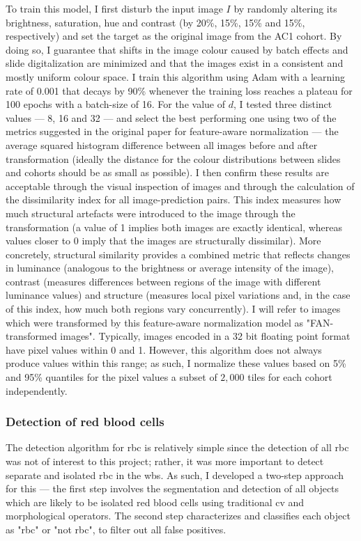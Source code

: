 To train this model, I first disturb the input image $I$ by randomly altering its brightness, saturation, hue and contrast (by 20\%, 15\%, 15\% and 15\%, respectively) and set the target as the original image from the AC1 cohort. By doing so, I guarantee that shifts in the image colour caused by batch effects and slide digitalization are minimized and that the images exist in a consistent and mostly uniform colour space. I train this algorithm using Adam with a learning rate of 0.001 that decays by 90\% whenever the training loss reaches a plateau for 100 epochs with a batch-size of 16. For the value of $d$, I tested three distinct values --- 8, 16 and 32 --- and select the best performing one using two of the metrics suggested in the original paper for feature-aware normalization \cite{Bug2017-kk} --- the average squared histogram difference between all images before and after transformation (ideally the distance for the colour distributions between slides and cohorts should be as small as possible). I then confirm these results are acceptable through the visual inspection of images and through the calculation of the dissimilarity index \cite{Wang2004-sl} for all image-prediction pairs. This index measures how much structural artefacts were introduced to the image through the transformation (a value of 1 implies both images are exactly identical, whereas values closer to 0 imply that the images are structurally dissimilar). More concretely, structural similarity provides a combined metric that reflects changes in luminance (analogous to the brightness or average intensity of the image), contrast (measures differences between regions of the image with different luminance values) and structure (measures local pixel variations and, in the case of this index, how much both regions vary concurrently). I will refer to images which were transformed by this feature-aware normalization model as "FAN-transformed images". Typically, images encoded in a 32 bit floating point format have pixel values within 0 and 1. However, this algorithm does not always produce values within this range; as such, I normalize these values based on 5\% and 95\% quantiles for the pixel values a subset of $2,000$ tiles for each cohort independently.  

\subsubsection{Detection of red blood cells}

The detection algorithm for \ac{rbc} is relatively simple since the detection of all \ac{rbc} was not of interest to this project; rather, it was more important to detect separate and isolated \ac{rbc} in the \ac{wbs}. As such, I developed a two-step approach for this --- the first step involves the segmentation and detection of all objects which are likely to be isolated red blood cells using traditional \ac{cv} and morphological operators. The second step characterizes and classifies each object as "\ac{rbc}" or "not \ac{rbc}", to filter out all false positives.

